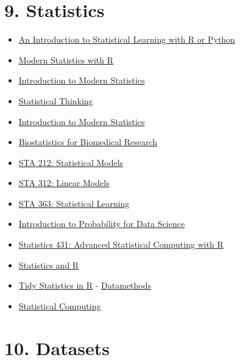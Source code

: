 \documentclass[
  letterpaper,
  DIV=11,
  numbers=noendperiod]{scrreprt}
\providecommand{\tightlist}{%
  \setlength{\itemsep}{0pt}\setlength{\parskip}{0pt}}\usepackage{longtable,booktabs,array}
\begin{document}
\hypertarget{statistics}{%
\section*{9. Statistics}\label{statistics}}


\begin{itemize}
\tightlist
\item
  \href{https://www.statlearning.com/}{An Introduction to Statistical
  Learning with R or Python}
\item
  \href{https://modernstatisticswithr.com/}{Modern Statistics with R}
\item
  \href{https://openintro-ims.netlify.app/index.html}{Introduction to
  Modern Statistics}
\item
  \href{https://www.fharrell.com/}{Statistical Thinking}
\item
  \href{https://openintro-ims.netlify.app/index.html}{Introduction to
  Modern Statistics}
\item
  \href{https://hbiostat.org/bbr/}{Biostatistics for Biomedical
  Research}
\item
  \href{https://sta-212-f19.lucymcgowan.com/}{STA 212: Statistical
  Models}
\item
  \href{https://sta-312-f20.netlify.app/}{STA 312: Linear Models}
\item
  \href{https://sta-363-s20.lucymcgowan.com/}{STA 363: Statistical
  Learning}
\item
  \href{https://probability4datascience.com/}{Introduction to
  Probability for Data Science}
\item
  \href{https://cal-poly-advanced-r.github.io/STAT-431/}{Statistics 431:
  Advanced Statistical Computing with R}
\item
  \href{https://tinystats.github.io/teacups-giraffes-and-statistics/index.html}{Statistics
  and R}
\item
  \href{https://themockup.blog/posts/2018-12-10-a-gentle-guide-to-tidy-statistics-in-r/}{Tidy
  Statistics in R} -
  \href{https://discourse.datamethods.org/}{Datamethods}
\item
  \href{https://www.stephaniehicks.com/jhustatcomputing2022/schedule}{Statistical
  Computing}
\end{itemize}

\hypertarget{datasets}{%
\section*{10. Datasets}\label{datasets}}
\end{document}
